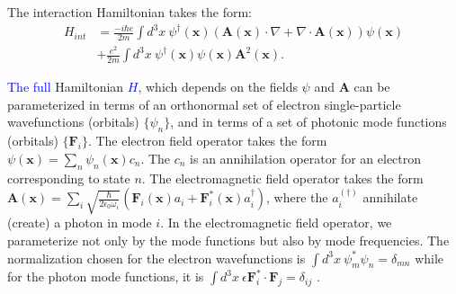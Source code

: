 \documentclass[aps,prl,twocolumn,
	groupedaddress,superscriptaddress,
	amsfonts,amssymb,amsmath,floatfix,
	citeautoscript]{revtex4-1}
\newcommand{\Jadd}[1]{\textcolor{blue}{#1}}
\begin{document}
The interaction Hamiltonian takes the form:
\begin{align}
H_{int} &= \frac{-i\hbar e}{2m}\int d^3x ~\psi^{\dagger}(\mathbf{x})(\mathbf{A}(\mathbf{x})\cdot\nabla +  \nabla \cdot \mathbf{A}(\mathbf{x}))\psi(\mathbf{x}) \nonumber \\ &+ \frac{e^2}{2m}\int d^3x ~\psi^{\dagger}(\mathbf{x})\psi(\mathbf{x})\mathbf{A}^2(\mathbf{x}).
\end{align}

\Jadd{The full} Hamiltonian \Jadd{${H}$}, which depends on the fields $\psi$ and $\mathbf{A}$ can be parameterized in terms of an orthonormal set of electron single-particle wavefunctions (orbitals) $\{\psi_n\}$, and in terms of a set of photonic mode functions (orbitals) $\{\mathbf{F}_i\}$. The electron field operator takes the form $\psi(\mathbf{x}) = \sum_n \psi_n(\mathbf{x})c_n$.
The $c_n$ is an annihilation operator for an electron corresponding to state $n$. The electromagnetic field operator takes the form $\mathbf{A}(\mathbf{x}) = \sum_i\sqrt{\frac{\hbar}{2\epsilon_0\omega_i}} \left(\mathbf{F}_i(\mathbf{x})a_i+\mathbf{F}^*_i(\mathbf{x})a^{\dagger}_i\right)$, where the $a_i^{(\dagger)}$ annihilate (create) a photon in mode $i$. In the electromagnetic field operator, we parameterize not only by the mode functions but also by mode frequencies. The normalization chosen for the electron wavefunctions is $\int d^3x~ \psi_m^*\psi_n = \delta_{mn}$ while for the photon mode functions, it is $\int d^3x~\epsilon\mathbf{F}_i^*\cdot\mathbf{F}_j = \delta_{ij}$ \cite{joannopoulos2011photonic}.
\end{document}
